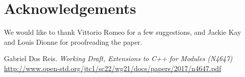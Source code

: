 \documentclass[reqno]{article}
\begin{document}
\section{Acknowledgements}
We would like to thank Vittorio Romeo for a few suggestions, and Jackie Kay and
Louis Dionne for proofreading the paper.



\begin{thebibliography}{9}

    Gabriel Dos Reis.
        \textit{Working Draft, Extensions to C++ for Modules (N4647)}
        \url{http://www.open-std.org/jtc1/sc22/wg21/docs/papers/2017/n4647.pdf}

\end{thebibliography}
\end{document}
